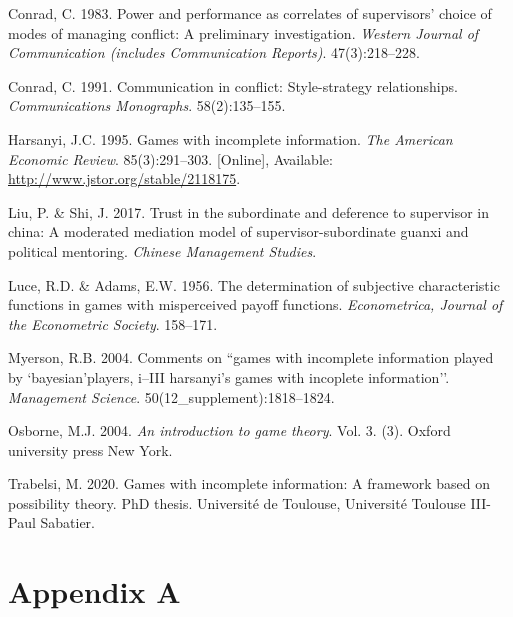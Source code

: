 \documentclass[11pt,preprint, authoryear]{elsarticle}
\numberwithin{equation}{section}
\numberwithin{figure}{section}
\numberwithin{table}{section}
\newlength{\cslhangindent}
\newenvironment{CSLReferences}%
  {\setlength{\parindent}{0pt}%
  \everypar{\setlength{\hangindent}{\cslhangindent}}\ignorespaces}%
  {\par}
\begin{document}
\hypertarget{refs}{}
\begin{CSLReferences}{1}{0}
\leavevmode\hypertarget{ref-power}{}%
Conrad, C. 1983. Power and performance as correlates of supervisors'
choice of modes of managing conflict: A preliminary investigation.
\emph{Western Journal of Communication (includes Communication
Reports)}. 47(3):218--228.

\leavevmode\hypertarget{ref-comm}{}%
Conrad, C. 1991. Communication in conflict: Style-strategy
relationships. \emph{Communications Monographs}. 58(2):135--155.

\leavevmode\hypertarget{ref-harsanyi}{}%
Harsanyi, J.C. 1995. Games with incomplete information. \emph{The
American Economic Review}. 85(3):291--303. {[}Online{]}, Available:
\url{http://www.jstor.org/stable/2118175}.

\leavevmode\hypertarget{ref-trust}{}%
Liu, P. \& Shi, J. 2017. Trust in the subordinate and deference to
supervisor in china: A moderated mediation model of
supervisor-subordinate guanxi and political mentoring. \emph{Chinese
Management Studies}.

\leavevmode\hypertarget{ref-luce1956}{}%
Luce, R.D. \& Adams, E.W. 1956. The determination of subjective
characteristic functions in games with misperceived payoff functions.
\emph{Econometrica, Journal of the Econometric Society}. 158--171.

\leavevmode\hypertarget{ref-2004com}{}%
Myerson, R.B. 2004. Comments on ``games with incomplete information
played by `bayesian'players, i--III harsanyi's games with incoplete
information''. \emph{Management Science}. 50(12\_supplement):1818--1824.

\leavevmode\hypertarget{ref-book}{}%
Osborne, M.J. 2004. \emph{An introduction to game theory}. Vol. 3. (3).
Oxford university press New York.

\leavevmode\hypertarget{ref-2020games}{}%
Trabelsi, M. 2020. Games with incomplete information: A framework based
on possibility theory. PhD thesis. Universit{é} de Toulouse,
Universit{é} Toulouse III-Paul Sabatier.

\end{CSLReferences}

\newpage

\hypertarget{appendix-a}{%
\section*{\texorpdfstring{Appendix A
\label{A}}{Appendix A }}\label{appendix-a}}
\end{document}
